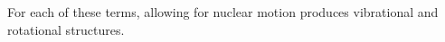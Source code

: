 For each of these terms, allowing for nuclear motion produces vibrational and rotational structures.
